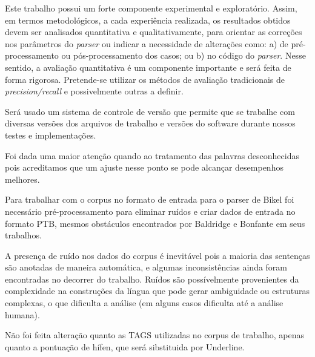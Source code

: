 Este trabalho possui um forte componente experimental e exploratório. Assim, em termos metodológicos, a cada experiência realizada, os resultados obtidos devem ser analisados quantitativa e qualitativamente, para orientar as correções nos parâmetros do \emph{parser} ou indicar a necessidade de alterações como: a) de pré-processamento ou pós-processamento dos casos; ou b) no código do \emph{parser}. Nesse sentido, a avaliação quantitativa é um componente importante e será feita de forma rigorosa. Pretende-se utilizar os métodos de avaliação tradicionais de \emph{precision/recall} \cite{black93} e possivelmente outras a definir.

Será usado um sistema de controle de versão que permite que se trabalhe com diversas versões dos arquivos de trabalho
e  versões do software durante nossos testes e implementações.

Foi dada uma maior atenção quando ao tratamento das palavras desconhecidas pois acreditamos que um ajuste nesse ponto se pode alcançar desempenhos melhores.

Para trabalhar com o corpus no formato de entrada para o parser de Bikel foi necessário pré-processamento para eliminar ruídos e criar dados de entrada no formato PTB, mesmos obstáculos encontrados por Baldridge \cite{baldridge06} e Bonfante\cite{bonfante03} em seus trabalhos. 

A presença de ruído nos dados do corpus é inevitável pois a maioria das sentenças são anotadas de maneira automática, e algumas inconsistências ainda foram encontradas no decorrer do trabalho. Ruídos são possívelmente provenientes da complexidade na construções da língua que pode gerar ambiguidade ou estruturas complexas, o que dificulta a análise (em alguns casos dificulta até a análise humana). %



Não foi feita alteração quanto as TAGS utilizadas no corpus de trabalho, apenas quanto a pontuação de hífen, que será sibstituida por Underline.

